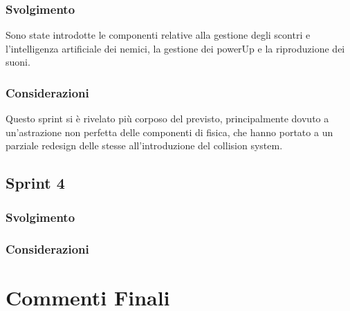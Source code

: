 \subsubsection{Svolgimento}
Sono state introdotte le componenti relative alla gestione degli scontri e l'intelligenza artificiale dei nemici, la gestione dei powerUp e la riproduzione dei suoni.
\subsubsection{Considerazioni}
Questo sprint si è rivelato più corposo del previsto, principalmente dovuto a un'astrazione non perfetta delle componenti di fisica, che hanno portato a un parziale redesign delle stesse all'introduzione del collision system.
\subsection{Sprint 4}
\subsubsection{Svolgimento}
\subsubsection{Considerazioni}
\section{Commenti Finali}